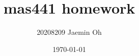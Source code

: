 \documentclass{oblivoir}
\begin{document}
\title{mas441 homework}
\author{20208209 Jaemin Oh}
\date{\today}

\maketitle


\end{document}
